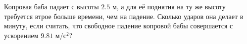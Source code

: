 Копровая баба падает с высоты $2.5$ м, а для её поднятия на ту же высоту
требуется втрое больше времени, чем на падение. Сколько ударов она
делает в минуту, если считать, что свободное падение копровой бабы
совершается с ускорением $9.81$ м/с$^2$?
